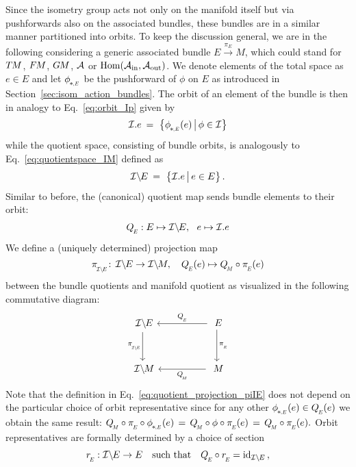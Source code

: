 Since the isometry group acts not only on the manifold itself but via pushforwards also on the associated bundles, these bundles are in a similar manner partitioned into orbits.
To keep the discussion general, we are in the following considering a generic associated bundle $E\xrightarrow{\pi_E} M$, which could stand for $T\mkern-1.5muM$, $F\mkern-1.5muM$, $G\mkern-1.4muM$, $\mathcal{A}$ or $\operatorname{Hom}(\mathcal{A}_\textup{in},\mathcal{A}_\textup{out})$.
We denote elements of the total space as $e\in E$ and let $\dphiE$ be the pushforward of $\phi$ on $E$ as introduced in Section~\ref{sec:isom_action_bundles}.
The orbit of an element of the bundle is then in analogy to Eq.~\eqref{eq:orbit_Ip} given by
\begin{align}\label{eq:bundle_orbit_def}
    \I.e \:=\ \big\{ \dphiE(e) \,\big|\, \phi\in\I \big\}
\end{align}
while the quotient space, consisting of bundle orbits, is analogously to Eq.~\eqref{eq:quotientspace_IM} defined as
\begin{align}
    \IE \:=\ \big\{ \I.e \,\big|\, e\in E \big\} \,.
\end{align}
Similar to before, the (canonical) quotient map sends bundle elements to their orbit:
\begin{align}
    \QE: E\mapsto\IE,\ \ e\mapsto\I.e
\end{align}
We define a (uniquely determined) projection map 
\begin{align}\label{eq:quotient_projection_piIE}
    \piIE\!:\, \IE \to \IM, \quad \QE(e) \mapsto \QM \circ \piE(e)
\end{align}
between the bundle quotients and manifold quotient as visualized in the following commutative diagram:
\begin{equation}\label{cd:QE_IE}
\begin{tikzcd}[column sep=50pt, row sep=30, font=\normalsize]
    \IE     \arrow[d, "\piIE"']
    &
    E       \arrow[l, "\QE"']
            \arrow[d, "\piE"]
    \\
    \IM
    &
    M       \arrow[l, "\QM"]
\end{tikzcd}
\end{equation}
Note that the definition in Eq.~\eqref{eq:quotient_projection_piIE} does not depend on the particular choice of orbit representative since for any other $\dphiE(e) \in \QE(e)$ we obtain the same result:
$    \QM \circ \piE \circ \dphiE(e)
\,=\,\QM \circ \phi \circ \piE(e)
\,=\,\QM \circ \piE(e) .
$
Orbit representatives are formally determined by a choice of section
\begin{align}\label{eq:bundle_quotient_section_def}
    \rE: \IE\to E \quad \textup{such that}\quad \QE\circ\rE = \id_{\IE} \,,
\end{align}
